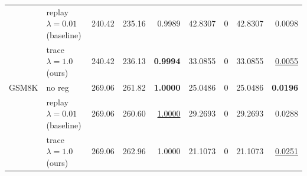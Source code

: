 \begin{table}[t]
{\begin{tabular}{l l rrrrrrr}
 & replay $\lambda{=}0.01$ (baseline) & 240.42 & 235.16 & 0.9989 & 42.8307 & \cellcolor{cyan!12} $0$ & 42.8307 & 0.0098 \\
 & trace $\lambda{=}1.0$ (ours) & 240.42 & 236.13 & \textbf{0.9994} & 33.0855 & \cellcolor{cyan!12} $0$ & 33.0855 & \underline{0.0055} \\
\midrule
GSM8K & no reg & 269.06 & 261.82 & \textbf{1.0000} & 25.0486 & \cellcolor{cyan!12} $0$ & 25.0486 & \textbf{0.0196} \\
 & replay $\lambda{=}0.01$ (baseline) & 269.06 & 260.60 & \underline{1.0000} & 29.2693 & \cellcolor{cyan!12} $0$ & 29.2693 & 0.0288 \\
 & trace $\lambda{=}1.0$ (ours) & 269.06 & 262.96 & 1.0000 & 21.1073 & \cellcolor{cyan!12} $0$ & 21.1073 & \underline{0.0251} \\
\bottomrule
\end{tabular}}
\end{table}